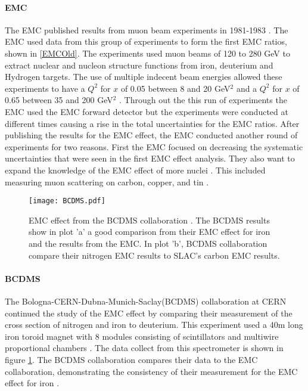 \paragraph{EMC} The EMC published results from muon beam experiments in 1981-1983 \cite{EMC_iron,EM,EMC_F2d,CERN_EMC}.  The EMC used data from this group of experiments to form the first EMC ratios, shown in \ref{EMCOld}. The experiments used muon beams of 120 to 280 GeV to extract nuclear and nucleon structure functions from iron, deuterium and Hydrogen targets. The use of multiple indecent beam energies allowed these experiments to have a $Q^2$ for $x$ of 0.05 between 8 and 20 GeV$^2$ and a $Q^2$ for $x$ of 0.65 between 35 and 200 GeV$^2$ \cite{CERN_EMC}. Through out the this run of experiments the EMC used the EMC forward detector but the experiments were conducted at different times causing a rise in the total uncertainties for the EMC ratios\cite{EM}. After publishing the results for the EMC effect, the EMC conducted another round of experiments for two reasons. First the EMC focused on decreasing the systematic uncertainties that were seen in the first EMC effect analysis. They also want to expand the knowledge of the EMC effect of more nuclei \cite{EMC_ext, Ajth}. This included measuring muon scattering on carbon, copper, and tin \cite{EMC_ext}.

\begin{figure}[H]
	\caption{EMC effect from the BCDMS collaboration \cite{BCDMS}. The BCDMS results show in plot 'a' a good comparison from their EMC effect for iron and the results from the EMC. In plot 'b', BCDMS collaboration compare their nitrogen EMC results to SLAC's carbon EMC results.}
	\label{fig:BCDMS}
	\centering
	\texttt{[image: BCDMS.pdf]}
\end{figure}
\paragraph{BCDMS}The Bologna-CERN-Dubna-Munich-Saclay(BCDMS) collaboration at CERN continued the study of the EMC effect by comparing their measurement of the cross section of nitrogen and iron to deuterium. This experiment used a 40m long iron toroid magnet with 8 modules consisting of scintillators and multiwire proportional chambers \cite{BCDMS}. The data collect from this spectrometer is shown in figure \ref{fig:BCDMS}. The BCDMS collaboration compares their data to the EMC collaboration, demonstrating the consistency of their measurement for the EMC effect for iron \cite{BCDMS,Norton}.

